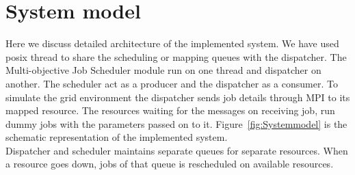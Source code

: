 \section{System model}
Here we discuss detailed architecture of the implemented system. We have used posix thread to share the scheduling or mapping queues with the dispatcher. The Multi-objective Job Scheduler module run on one thread and dispatcher on another. The scheduler act as a producer and the dispatcher as a consumer. To simulate the grid environment the dispatcher sends job details through MPI to its mapped resource. The resources waiting for the messages on receiving job, run dummy jobs with the parameters passed on to it. Figure~\ref{fig:Systemmodel} is the schematic representation of the implemented system.\\
Dispatcher and scheduler maintains separate queues for separate resources. When  a resource goes down, jobs of that queue is rescheduled on available resources.
